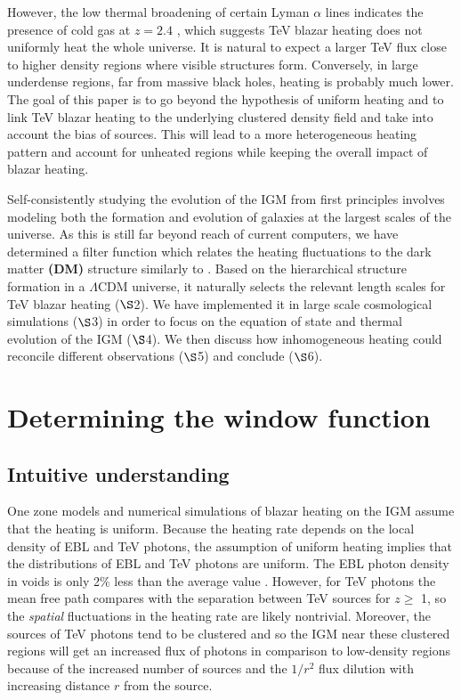 \documentclass[numberedappendix]{emulateapj}
\newcommand\ALc[1]{{\color{red} \bf #1}} %
\begin{document}
However, the low thermal broadening of certain Lyman $\alpha$ lines indicates the presence of cold gas at $z =2.4$ \citep{2012ApJ...757L..30R}, which suggests TeV blazar heating does not uniformly heat the whole universe. It is natural to expect a larger TeV flux close to higher density regions where visible structures form. Conversely, in large underdense regions, far from massive black holes, heating is probably much lower. The goal of this paper is to go beyond the hypothesis of uniform heating and to link TeV blazar heating to the underlying clustered density field and take into account the bias of sources. This will lead to a more heterogeneous heating pattern and account for unheated regions while keeping the overall impact of blazar heating.

Self-consistently studying the evolution of the IGM from first principles involves modeling both the formation and evolution of galaxies at the largest scales of the universe. As this is still far beyond reach of current computers, we have determined a filter function which relates the heating fluctuations to the dark matter \ALc{(DM)} structure similarly to \citet{2007MNRAS.376.1680P,2005ApJ...626....1B,2014PhRvD..89h3010P}. Based on the hierarchical structure formation in a $\Lambda$CDM universe, it naturally selects the relevant length scales for TeV blazar heating ($\S$2). We have implemented it in large scale cosmological simulations ($\S$3) in order to focus on the equation of state and thermal evolution of the IGM ($\S$4). We then discuss how inhomogeneous heating could reconcile different observations ($\S$5) and conclude ($\S$6).

\section {Determining the window function}\label{window}
\subsection{Intuitive understanding}
One zone models \citep{2012ApJ...752...23C,2012ApJ...752...24P} and numerical simulations \citep{2012MNRAS.423..149P} of blazar heating on the IGM assume that the heating is uniform. Because the heating rate depends on the local density of EBL and TeV photons, the assumption of uniform heating implies that the distributions of EBL and TeV photons are uniform. The EBL photon density in voids is only 2$\%$ less than the average value \citep{2014arXiv1407.6370F}. However, for TeV photons the mean free path compares with the separation between TeV sources for $z\geqslant$ 1, so the {\it spatial} fluctuations in the heating rate are likely nontrivial. Moreover, the sources of TeV photons tend to be clustered and so the IGM near these clustered regions will get an increased flux of photons in comparison to low-density regions because of the increased number of sources and the $1/r^2$ flux dilution with increasing distance $r$ from the source.
\end{document}

